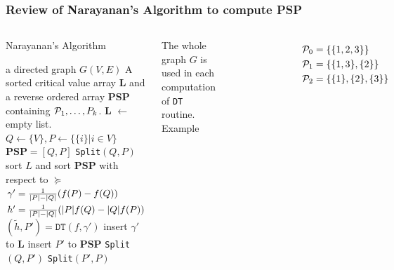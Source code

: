 \documentclass[notheorems]{beamer}
\begin{document}
\begin{frame}
\frametitle{Review of Narayanan's Algorithm to compute PSP}
\begin{columns}
\begin{algorithm}[H]
\caption*{Narayanan's Algorithm}\label{alg:psp}
{\tiny
\begin{algorithmic}[1]
\REQUIRE a directed graph $G(V,E)$
\ENSURE A sorted critical value array \textbf{L} and a reverse ordered array \textbf{PSP} containing $\P_1,\dots, P_k$.
\STATE \textbf{L}  $\leftarrow$ empty list.
\STATE $Q\leftarrow \{V\}, P \leftarrow \{ \{i \} | i \in V\}$
\STATE $\mathbf{PSP}= [Q, P]$
\STATE \texttt{Split}$(Q,P)$
\STATE sort $L$ and sort $\mathbf{PSP}$ with respect to $\succeq$ 
 \STATE\label{alg:gamma} $\gamma' = {1 \over \abs{P} - \abs{Q}} (f(P)-f(Q))$
 \STATE $h' = {1 \over \abs{P} - \abs{Q}}(\abs{P} f(Q) - \abs{Q} f(P))$
 \STATE $(\tilde{h}, P') = \texttt{DT}(f,\gamma')$
 	\STATE insert $\gamma'$ to $\mathbf{L}$
 \ELSE
 	\STATE insert $P'$ to $\mathbf{PSP}$
 	\STATE \texttt{Split}$(Q, P')$
 	\STATE \texttt{Split}$(P',P)$
 \ENDIF
\ENDFUNCTION
\end{algorithmic}
}
\end{algorithm}
The whole graph $G$ is used in each computation of \texttt{DT} routine.
Example
\begin{figure}
\includegraphics[width=4.5cm]{pic/dt_with_graph.eps}
\end{figure}
\begin{align*}
\P_0  & = \{\{1,2,3\}\} \\
\P_1  & = \{\{1,3\},\{2\}\} \\
\P_2  & = \{\{1\},\{2\},\{3\}\} 
\end{align*}
\end{columns}
\end{frame}
\end{document}
